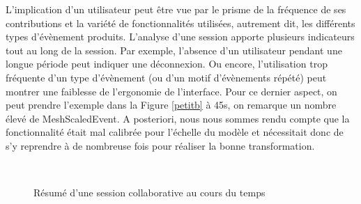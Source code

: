 L'implication d'un utilisateur peut être vue par le prisme de la fréquence de ses 
contributions et la variété de fonctionnalités utilisées, autrement dit, les différents 
types d'évènement produits. L'analyse d'une session apporte plusieurs indicateurs 
tout au long de la session. Par exemple, l'absence d'un utilisateur pendant une 
longue période peut indiquer une déconnexion. Ou encore, l'utilisation trop 
fréquente d'un type d'évènement (ou d'un motif d'évènements répété) peut montrer 
une faiblesse de l'ergonomie de l'interface. Pour ce dernier aspect, on peut prendre 
l'exemple dans la Figure \ref{petitb} à 45s, on remarque un nombre élevé de 
MeshScaledEvent. A posteriori, nous nous sommes rendu compte que la 
fonctionnalité était mal calibrée pour l'échelle du modèle et nécessitait donc de s'y 
reprendre à de nombreuse fois pour réaliser la bonne transformation.

\begin{figure}[ht]
	\centering
	
	 \\
	\caption{Résumé d'une session collaborative au cours du temps}
	\label{fig:collabsession}
\end{figure}

